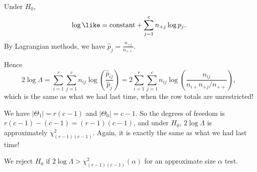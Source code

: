 \documentclass[a4paper]{article}
\begin{document}
Under $H_0$,
\[
  \log\like = \text{constant} + \sum_{j = 1}^c n_{+j}\log p_j.
\]
By Lagrangian methods, we have $\hat{p}_j = \frac{n_{+j}}{n_{++}}$.

Hence
\[
  2\log \Lambda = \sum_{i = 1}^{r}\sum_{j = 1}^c n_{ij}\log\left(\frac{\hat{p}_{ij}}{\hat{p}_j}\right) = 2\sum_{i = 1}^r\sum_{j = 1}^c n_{ij}\log\left(\frac{n_{ij}}{n_{i+}n_{+j}/n_{++}}\right),
\]
which is the same as what we had last time, when the row totals are unrestricted!

We have $|\Theta_1| = r(c - 1)$ and $|\Theta_0| = c - 1$. So the degrees of freedom is $r(c - 1) - (c - 1) = (r - 1)(c - 1)$, and under $H_0$, $2\log\Lambda$ is approximately $\chi^2_{(r - 1)(c - 1)}$. Again, it is exactly the same as what we had last time!

We reject $H_0$ if $2\log \Lambda > \chi_{(r - 1)(c - 1)}^2 (\alpha)$ for an approximate size $\alpha$ test.
\end{document}
